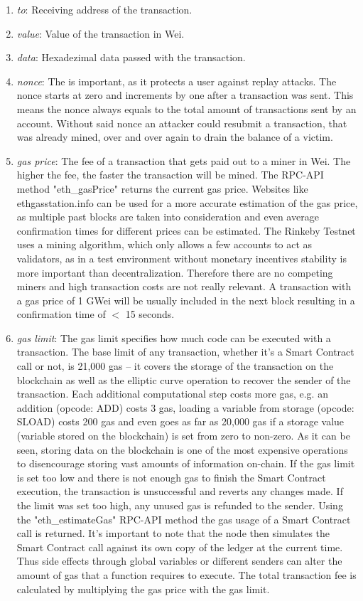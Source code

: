\begin{enumerate}
  \item \textit{to}: Receiving address of the transaction.
  \item \textit{value}: Value of the transaction in Wei.
  \item \textit{data}: Hexadezimal data passed with the transaction.
  \item \textit{nonce}: The  is important, as it protects a user against replay attacks. The nonce starts at zero and increments by one after a transaction was sent. This means the nonce always equals to the total amount of transactions sent by an account. Without said nonce an attacker could resubmit a transaction, that was already mined, over and over again to drain the balance of a victim.
  \item \textit{gas price}: The fee of a transaction that gets paid out to a miner in Wei. The higher the fee, the faster the transaction will be mined. The RPC-API method "eth\_gasPrice" returns the current gas price. Websites like ethgasstation.info can be used for a more accurate estimation of the gas price, as multiple past blocks are taken into consideration and even average confirmation times for different prices can be estimated. The Rinkeby Testnet uses a  mining algorithm, which only allows a few accounts to act as validators, as in a test environment without monetary incentives stability is more important than decentralization. Therefore there are no competing miners and high transaction costs are not really relevant. A transaction with a gas price of 1 GWei will be usually included in the next block resulting in a confirmation time of $<$ 15 seconds.
  \item \textit{gas limit}: The gas limit specifies how much code can be executed with a transaction. The base limit of any transaction, whether it's a Smart Contract call or not, is 21,000 gas – it covers the storage of the transaction on the blockchain as well as the elliptic curve operation to recover the sender of the transaction\cite{design-rationale}. Each additional computational step costs more gas, e.g. an addition (opcode: ADD) costs 3 gas, loading a variable from storage (opcode: SLOAD) costs 200 gas and even goes as far as 20,000 gas if a storage value (variable stored on the blockchain) is set from zero to non-zero. As it can be seen, storing data on the blockchain is one of the most expensive operations to disencourage storing vast amounts of information on-chain. If the gas limit is set too low and there is not enough gas to finish the Smart Contract execution, the transaction is unsuccessful and reverts any changes made. If the limit was set too high, any unused gas is refunded to the sender. Using the "eth\_estimateGas" RPC-API method the gas usage of a Smart Contract call is returned. It's important to note that the node then simulates the Smart Contract call against its own copy of the ledger at the current time. Thus side effects through global variables or different senders can alter the amount of gas that a function requires to execute. The total transaction fee is calculated by multiplying the gas price with the gas limit.

\end{enumerate}
